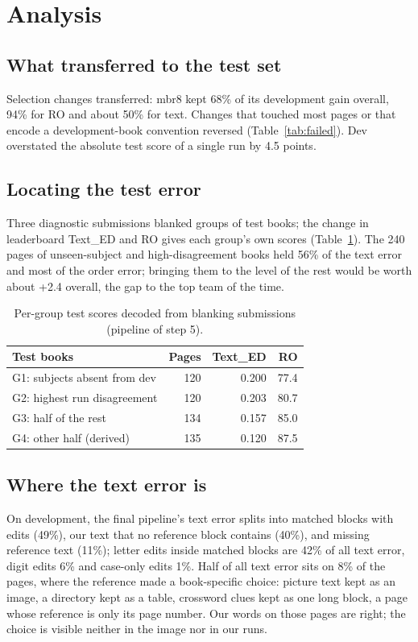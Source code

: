 \documentclass[11pt]{article}
\newcommand{\ted}{Text\_ED}
\newcommand{\ro}{RO}
\begin{document}
\section{Analysis}
\label{sec:analysis}

\subsection{What transferred to the test set}
Selection changes transferred: mbr8 kept 68\% of its development gain overall, 94\% for \ro{} and about 50\% for text. Changes that touched most pages or that encode a development-book convention reversed (Table~\ref{tab:failed}). Dev overstated the absolute test score of a single run by 4.5 points.

\subsection{Locating the test error}
Three diagnostic submissions blanked groups of test books; the change in leaderboard \ted{} and \ro{} gives each group's own scores (Table~\ref{tab:probe}). The 240 pages of unseen-subject and high-disagreement books held 56\% of the text error and most of the order error; bringing them to the level of the rest would be worth about +2.4 overall, the gap to the top team of the time.

\begin{table}[t]
\centering\small
\setlength{\tabcolsep}{3.5pt}
\begin{tabular}{lrrr}
\toprule
Test books & Pages & \ted & \ro \\
\midrule
G1: subjects absent from dev & 120 & 0.200 & 77.4 \\
G2: highest run disagreement & 120 & 0.203 & 80.7 \\
G3: half of the rest & 134 & 0.157 & 85.0 \\
G4: other half (derived) & 135 & 0.120 & 87.5 \\
\bottomrule
\end{tabular}
\caption{Per-group test scores decoded from blanking submissions (pipeline of step 5).}
\label{tab:probe}
\end{table}

\subsection{Where the text error is}
On development, the final pipeline's text error splits into matched blocks with edits (49\%), our text that no reference block contains (40\%), and missing reference text (11\%); letter edits inside matched blocks are 42\% of all text error, digit edits 6\% and case-only edits 1\%. Half of all text error sits on 8\% of the pages, where the reference made a book-specific choice: picture text kept as an image, a directory kept as a table, crossword clues kept as one long block, a page whose reference is only its page number. Our words on those pages are right; the choice is visible neither in the image nor in our runs.
\end{document}
